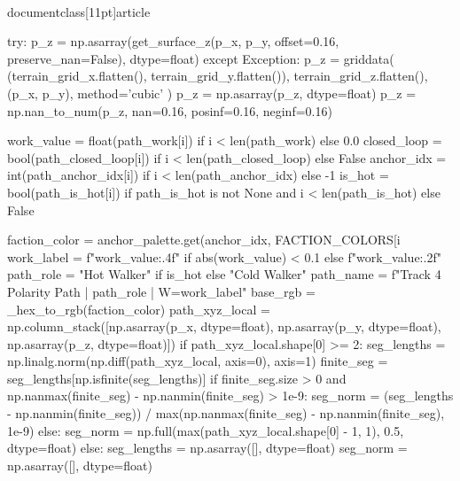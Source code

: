 \\documentclass[11pt]{article}
\begin{document}
\begin{CodeBlock}
{{{{{{                    try:
                        p_z = np.asarray(get_surface_z(p_x, p_y, offset=0.16, preserve_nan=False), dtype=float)
                    except Exception:
                        p_z = griddata(
                            (terrain_grid_x.flatten(), terrain_grid_y.flatten()),
                            terrain_grid_z.flatten(),
                            (p_x, p_y),
                            method='cubic'
                        )
                        p_z = np.asarray(p_z, dtype=float)
                    p_z = np.nan_to_num(p_z, nan=0.16, posinf=0.16, neginf=0.16)
                    
                    work_value = float(path_work[i]) if i < len(path_work) else 0.0
                    closed_loop = bool(path_closed_loop[i]) if i < len(path_closed_loop) else False
                    anchor_idx = int(path_anchor_idx[i]) if i < len(path_anchor_idx) else -1
                    is_hot = bool(path_is_hot[i]) if path_is_hot is not None and i < len(path_is_hot) else False

                    faction_color = anchor_palette.get(anchor_idx, FACTION_COLORS[i %
                    work_label = f"{work_value:.4f}" if abs(work_value) < 0.1 else f"{work_value:.2f}"
                    path_role = "Hot Walker" if is_hot else "Cold Walker"
                    path_name = f"Track 4 Polarity Path | {path_role} | W={work_label}"
                    base_rgb = _hex_to_rgb(faction_color)
                    path_xyz_local = np.column_stack([np.asarray(p_x, dtype=float), np.asarray(p_y, dtype=float), np.asarray(p_z, dtype=float)])
                    if path_xyz_local.shape[0] >= 2:
                        seg_lengths = np.linalg.norm(np.diff(path_xyz_local, axis=0), axis=1)
                        finite_seg = seg_lengths[np.isfinite(seg_lengths)]
                        if finite_seg.size > 0 and np.nanmax(finite_seg) - np.nanmin(finite_seg) > 1e-9:
                            seg_norm = (seg_lengths - np.nanmin(finite_seg)) / max(np.nanmax(finite_seg) - np.nanmin(finite_seg), 1e-9)
                        else:
                            seg_norm = np.full(max(path_xyz_local.shape[0] - 1, 1), 0.5, dtype=float)
                    else:
                        seg_lengths = np.asarray([], dtype=float)
                        seg_norm = np.asarray([], dtype=float)

}}}}}}
\end{CodeBlock}
\end{document}
